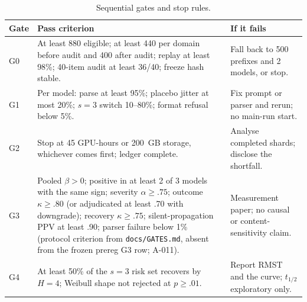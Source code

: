 \documentclass[a4paper,fleqn]{cas-sc}
\begin{document}
\begin{table}[pos=htbp]
  \centering
  \caption{Sequential gates and stop rules.}
  \label{tab:gates}
  \footnotesize
  \setlength{\tabcolsep}{4pt}
  \begin{tabular}{>{\raggedright\arraybackslash}p{0.9cm}>{\raggedright\arraybackslash}p{9.6cm}>{\raggedright\arraybackslash}p{4.2cm}}
    \toprule
    \textbf{Gate} & \textbf{Pass criterion} & \textbf{If it fails} \\
    \midrule
    G0 & At least 880 eligible; at least 440 per domain before audit and 400 after audit; replay at least 98\%; 40-item audit at least 36/40; freeze hash stable. & Fall back to 500 prefixes and 2 models, or stop. \\
    G1 & Per model: parse at least 95\%; placebo jitter at most 20\%; $s=3$ switch 10--80\%; format refusal below 5\%. & Fix prompt or parser and rerun; no main-run start. \\
    G2 & Stop at 45 GPU-hours or 200~GB storage, whichever comes first; ledger complete. & Analyse completed shards; disclose the shortfall. \\
    G3 & Pooled $\beta>0$; positive in at least 2 of 3 models with the same sign; severity $\alpha \ge .75$; outcome $\kappa \ge .80$ (or adjudicated at least .70 with downgrade); recovery $\kappa \ge .75$; silent-propagation PPV at least .90; parser failure below 1\% (protocol criterion from \texttt{docs/GATES.md}, absent from the frozen prereg G3 row; A-011). & Measurement paper; no causal or content-sensitivity claim. \\
    G4 & At least 50\% of the $s=3$ risk set recovers by $H=4$; Weibull shape not rejected at $p \ge .01$. & Report RMST and the curve; $t_{1/2}$ exploratory only. \\
    \bottomrule
  \end{tabular}
\end{table}
\end{document}
